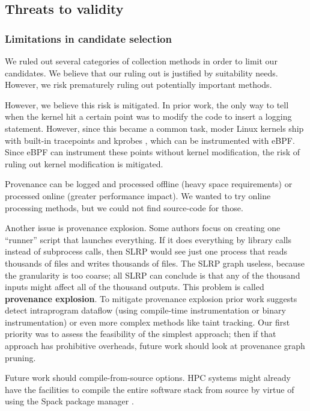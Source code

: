 \subsection{Threats to validity}

\subsubsection{Limitations in candidate selection}

We ruled out several categories of collection methods in order to limit our candidates.
We believe that our ruling out is justified by suitability needs.
However, we risk prematurely ruling out potentially important methods.

However, we believe this risk is mitigated.
In prior work, the only way to tell when the kernel hit a certain point was to modify the code to insert a logging statement.
However, since this became a common task, moder Linux kernels ship with built-in tracepoints \cite{desnoyers_using_nodate} and kprobes \cite{keniston_kernel_nodate}, which can be instrumented with eBPF.
Since eBPF can instrument these points without kernel modification, the risk of ruling out kernel modification is mitigated.

Provenance can be logged and processed offline (heavy space requirements) or processed online (greater performance impact).
We wanted to try online processing methods, but we could not find source-code for those.

Another issue is provenance explosion.
Some authors focus on creating one ``runner'' script that launches everything.
If it does everything by library calls instead of subprocess calls, then SLRP would see just one process that reads thousands of files and writes thousands of files.
The SLRP graph useless, because the granularity is too coarse; all SLRP can conclude is that any of the thousand inputs might affect all of the thousand outputs.
This problem is called \textbf{provenance explosion}.
To mitigate provenance explosion prior work suggests detect intraprogram dataflow (using compile-time instrumentation or binary instrumentation) or even more complex methods like taint tracking.
Our first priority was to assess the feasibility of the simplest approach; then if that approach has prohibitive overheads, future work should look at provenance graph pruning.

Future work should compile-from-source options.
HPC systems might already have the facilities to compile the entire software stack from source by virtue of using the Spack package manager \cite{gamblin_spack_2015}.


